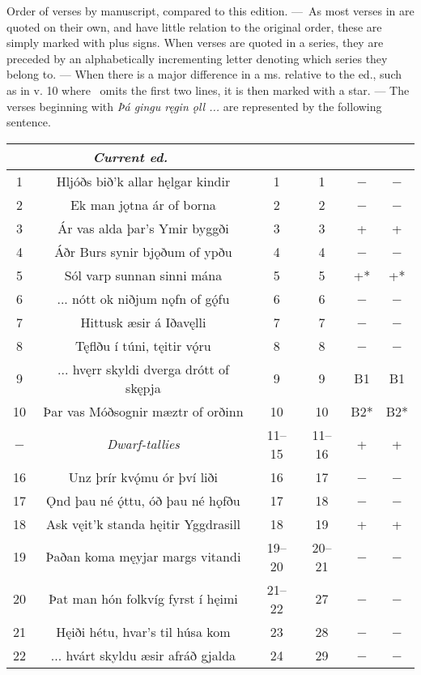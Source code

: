 {Order of verses by manuscript, compared to this edition. — As most verses in \GylfMS are quoted on their own, and have little relation to the original order, these are simply marked with plus signs. When verses are quoted in a series, they are preceded by an alphabetically incrementing letter denoting which series they belong to. — When there is a major difference in a ms. relative to the ed., such as in v. 10 where \GylfMS\ omits the first two lines, it is then marked with a star. — The verses beginning with \emph{Þá gingu ręgin ǫll ...} are represented by the following sentence.
\begin{longtable}{|c c c c c c|} 
	\hline
	\multicolumn{2}{c}{\emph{Current ed.}} & \Regius & \Hauksbok & \RegiusProse\Trajectinus\Wormianus & \Upsaliensis \\ [0.5ex]
	\hline\hline
	1 & Hljóðs bið’k allar hęlgar kindir & 1 & 1 & − & − \\
	2 & Ek man jǫtna ár of borna & 2 & 2 & − & − \\
	3 & Ár vas alda þar’s Ymir byggði & 3 & 3 & + & + \\
	4 & Áðr Burs synir bjǫðum of ypðu & 4 & 4 & − & − \\
	5 & Sól varp sunnan sinni mána & 5 & 5 & +* & +* \\
	6 & ... nótt ok niðjum nǫfn of gǫ́fu & 6 & 6 & − & − \\
	7 & Hittusk æsir á Iðavęlli & 7 & 7 & − & − \\
	8 & Tęflðu í túni, tęitir vǫ́ru & 8 & 8 & − & − \\
	9 & ... hvęrr skyldi dverga drótt of skępja & 9 & 9 & B1 & B1 \\
	10 & Þar vas Móðsognir mæztr of orðinn & 10 & 10 & B2* & B2* \\
	− & \emph{Dwarf-tallies} & 11–15 & 11–16 & + & + \\
	16 & Unz þrír kvǫ́mu ór því liði & 16 & 17 & − & − \\
	17 & Ǫnd þau né ǫ́ttu, óð þau né hǫfðu & 17 & 18 & − & − \\
	18 & Ask vęit’k standa hęitir Yggdrasill & 18 & 19 & + & + \\
	19 & Þaðan koma męyjar margs vitandi & 19–20 & 20–21 & − & − \\
	20 & Þat man hón folkvíg fyrst í hęimi & 21–22 & 27 & − & − \\
	21 & Hęiði hétu, hvar’s til húsa kom & 23 & 28 & − & − \\
	22 & ... hvárt skyldu æsir afráð gjalda & 24 & 29 & − & − \\

\end{longtable}}
